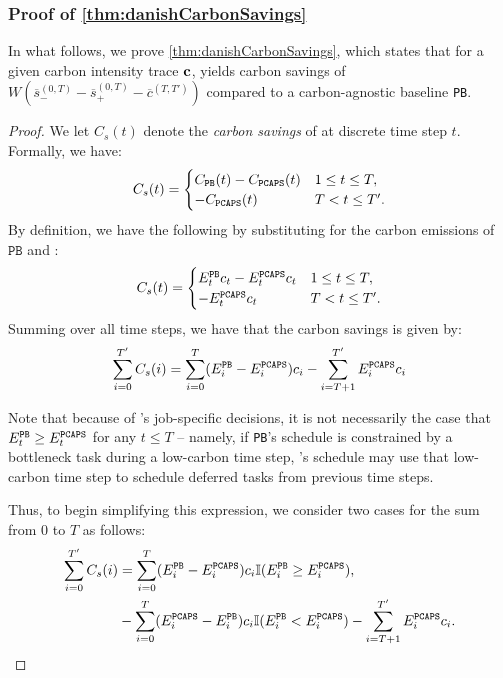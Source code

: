\subsubsection{\textbf{Proof of \autoref{thm:danishCarbonSavings}}}\label{apx:danishCarbonSavings}

In what follows, we prove \autoref{thm:danishCarbonSavings}, which states that for a given carbon intensity trace ${\mathbf{c}}$, \DANISH yields carbon savings of $W \left( \overline{s}_{-}^{(0,T)} - \overline{s}_{+}^{(0,T)} - \overline{c}^{(T, T')} \right)$ compared to a carbon-agnostic baseline \texttt{PB}. %

\begin{proof}
We let $C_s(t)$ denote the \textit{carbon savings} of \DANISH at discrete time step $t$.  Formally, we have:
\[
C_s(t) = \begin{cases}
    C_{\texttt{PB}}(t) - C_{\texttt{PCAPS}}(t) &  1 \leq t \leq T,\\
    - C_{\texttt{PCAPS}}(t) & T < t \leq T'.
\end{cases}
\]
By definition, we have the following by substituting for the carbon emissions of $\texttt{PB}$ and \DANISH:
\[
C_s(t) = \begin{cases}
    E^\texttt{PB}_t c_t  - E^\texttt{PCAPS}_t c_t &  1 \leq t \leq T,\\
    - E^\texttt{PCAPS}_t c_t& T < t \leq T'.
\end{cases}
\]
Summing over all time steps, we have that the carbon savings is given by:
\[
\sum_{i=0}^{T'} C_s(i) = \sum_{i=0}^{T} (E^\texttt{PB}_i-E^\texttt{PCAPS}_i) c_i - \sum_{i=T+1}^{T'} E^\texttt{PCAPS}_i c_i
\]

Note that because of \DANISH's job-specific decisions, it is not necessarily the case that $E^\texttt{PB}_t \geq E^\texttt{PCAPS}_t$ for any $t \leq T$ -- namely, if \texttt{PB}'s schedule is constrained by a bottleneck task during a low-carbon time step, \DANISH's schedule may use that low-carbon time step to schedule deferred tasks from previous time steps.

Thus, to begin simplifying this expression, we consider two cases for the sum from $0$ to $T$ as follows:
\begin{align*}
\sum_{i=0}^{T'} C_s(i) &= \sum_{i=0}^{T} (E^\texttt{PB}_i-E^\texttt{PCAPS}_i) c_i \mathbb{I}(E^\texttt{PB}_i \geq E^\texttt{PCAPS}_i),\\
& - \sum_{i=0}^{T} (E^\texttt{PCAPS}_i - E^\texttt{PB}_i) c_i \mathbb{I}(E^\texttt{PB}_i < E^\texttt{PCAPS}_i) - \sum_{i=T+1}^{T'} E^\texttt{PCAPS}_i c_i.
\end{align*}


\end{proof}
